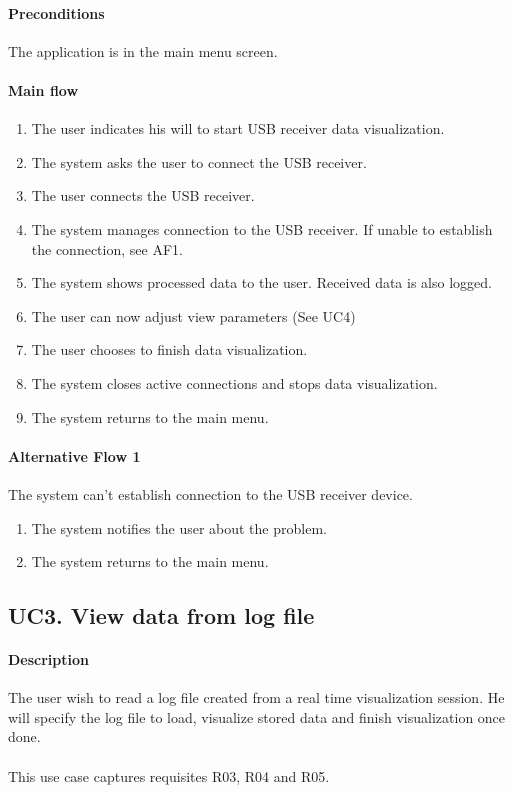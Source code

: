 			\paragraph{Preconditions} The application is in the main menu screen.
			\paragraph{Main flow}
				\begin{enumerate}
				\item The user indicates his will to start USB receiver data visualization.
				\item The system asks the user to connect the USB receiver.
				\item The user connects the USB receiver.
				\item The system manages connection to the USB receiver. If unable to establish the connection, see AF1.
				\item The system shows processed data to the user. Received data is also logged.
				\item The user can now adjust view parameters (See UC4)
				\item The user chooses to finish data visualization.
				\item The system closes active connections and stops data visualization.
				\item The system returns to the main menu.
				\end{enumerate}

			\paragraph{Alternative Flow 1} The system can't establish connection to the USB receiver device.
				\begin{enumerate}
				\item The system notifies the user about the problem.
				\item The system returns to the main menu.
				\end{enumerate}

		\subsection{UC3. View data from log file}

			\paragraph{Description} The user wish to read a log file created from a real time visualization session. He will specify the log file to load, visualize stored data and finish visualization once done.\\
			\\This use case captures requisites R03, R04 and R05.

